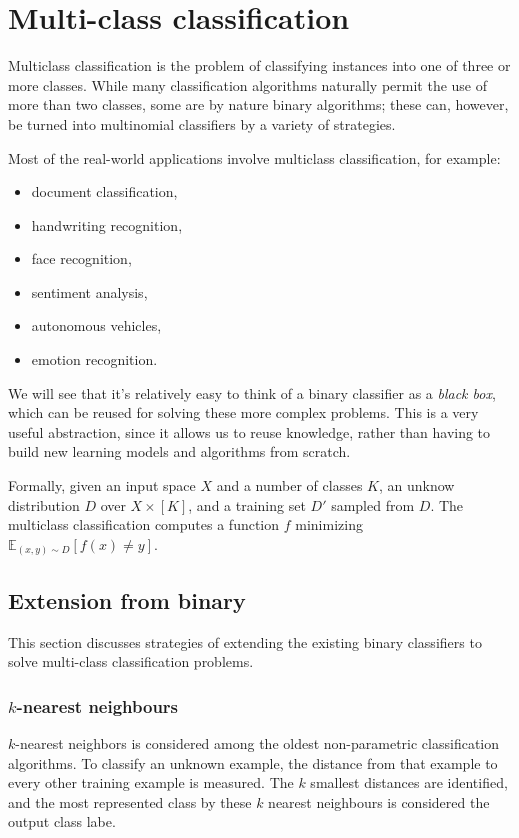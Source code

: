 \chapter{Multi-class classification}

Multiclass classification is the problem of classifying instances into one of three or more classes. While many classification algorithms naturally permit the use of more than two classes, some are by nature binary algorithms; these can, however, be turned into multinomial classifiers by a variety of strategies.

Most of the real-world applications involve multiclass classification, for example:
\begin{itemize}[topsep={0pt}, partopsep={0pt}]
    \item document classification,
    \item handwriting recognition,
    \item face recognition,
    \item sentiment analysis,
    \item autonomous vehicles,
    \item emotion recognition.
\end{itemize}

We will see that it's relatively easy to think of a binary classifier as a \emph{black box}, which can be reused for solving these more complex problems. This is a very useful abstraction, since it allows us to reuse knowledge, rather than having to build new learning models and algorithms from scratch.

Formally, given an input space \(X\) and a number of classes \(K\), an unknow distribution \(D\) over \(X \times [K]\), and a training set \(D'\) sampled from \(D\). The multiclass classification computes a function \(f\) minimizing \(\mathbb{E}_{(x,y)\sim D} [f(x) \neq y]\).

\section{Extension from binary}

This section discusses strategies of extending the existing binary classifiers to solve multi-class classification problems.

\subsection{\(k\)-nearest neighbours}
\(k\)-nearest neighbors is considered among the oldest non-parametric classification algorithms. To classify an unknown example, the distance from that example to every other training example is measured. The \(k\) smallest distances are identified, and the most represented class by these \(k\) nearest neighbours is considered the output class labe.


